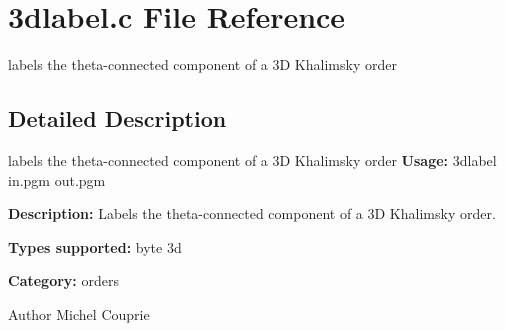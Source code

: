 \section{3dlabel.c File Reference}
\label{3dlabel_8c}


labels the theta-\/connected component of a 3D Khalimsky order  




\subsection{Detailed Description}
labels the theta-\/connected component of a 3D Khalimsky order {\bfseries Usage:} 3dlabel in.pgm out.pgm

{\bfseries Description:} Labels the theta-\/connected component of a 3D Khalimsky order.

{\bfseries Types supported:} byte 3d

{\bfseries Category:} orders

\begin{DoxyAuthor}{Author}
Michel Couprie 
\end{DoxyAuthor}
